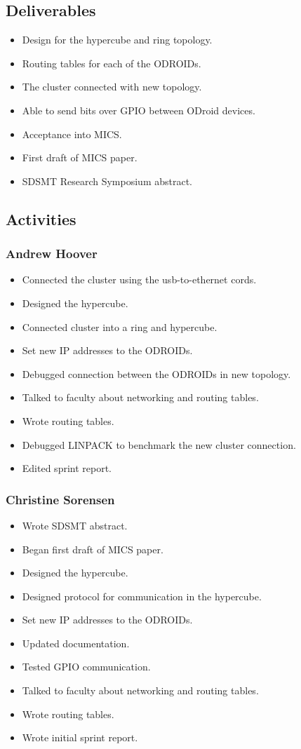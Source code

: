 \subsection*{Deliverables}
\begin{itemize}
	\item Design for the hypercube and ring topology.
	\item Routing tables for each of the ODROIDs.
	\item The cluster connected with new topology.
	\item Able to send bits over GPIO between ODroid devices.
	\item Acceptance into MICS.
	\item First draft of MICS paper.
	\item SDSMT Research Symposium abstract.
\end{itemize}

\subsection*{Activities}

\subsubsection*{Andrew Hoover}
\begin{itemize}
	\item Connected the cluster using the usb-to-ethernet cords.
	\item Designed the hypercube.
	\item Connected cluster into a ring and hypercube.
	\item Set new IP addresses to the ODROIDs.
	\item Debugged connection between the ODROIDs in new topology.
	\item Talked to faculty about networking and routing tables.
	\item Wrote routing tables.
	\item Debugged LINPACK to benchmark the new cluster connection.
	\item Edited sprint report.
\end{itemize}
\subsubsection*{Christine Sorensen}
\begin{itemize}
	\item Wrote SDSMT abstract.
	\item Began first draft of MICS paper.
	\item Designed the hypercube.
	\item Designed protocol for communication in the hypercube.
	\item Set new IP addresses to the ODROIDs.
	\item Updated documentation.
	\item Tested GPIO communication.
	\item Talked to faculty about networking and routing tables.
	\item Wrote routing tables.	
	\item Wrote initial sprint report.
\end{itemize}

